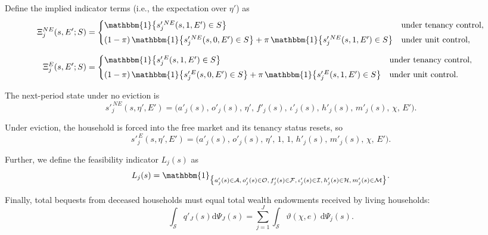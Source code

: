 \documentclass[parskip=full]{article}
\begin{document}
\noindent Define the implied indicator terms (i.e., the expectation over $\eta'$) as
\begin{equation}\label{eq:Xi_def}
\begin{aligned}
\Xi^{NE}_j(s,E';S)&=\begin{cases}
\mathbbm{1}\!\left\{ s'^{\,NE}_j(s,1,E') \in S \right\}
& \text{under tenancy control},\\[0.35em]
(1-\pi)\,\mathbbm{1}\!\left\{ s'^{\,NE}_j(s,0,E') \in S \right\}
+\pi\,\mathbbm{1}\!\left\{ s'^{\,NE}_j(s,1,E') \in S \right\}
& \text{under unit control},
\end{cases}
\\[0.6em]
\Xi^{E}_j(s,E';S)&=\begin{cases}
\mathbbm{1}\!\left\{ s'^{\,E}_j(s,1,E') \in S \right\}
& \text{under tenancy control},\\[0.35em]
(1-\pi)\,\mathbbm{1}\!\left\{ s'^{\,E}_j(s,0,E') \in S \right\}
+\pi\,\mathbbm{1}\!\left\{ s'^{\,E}_j(s,1,E') \in S \right\}
& \text{under unit control}.
\end{cases}
\end{aligned}
\end{equation}

\noindent The next-period state under no eviction is
\begin{equation}\label{eq:sprime_no_eviction}
s'^{\,NE}_j(s,\eta',E')=\bigl(a'_j(s),\,o'_j(s),\,\eta',\,f'_j(s),\,\iota'_j(s),\,h'_j(s),\,m'_j(s),\,\chi,\,E'\bigr).
\end{equation}

\noindent Under eviction, the household is forced into the free market and its tenancy status resets, so
\begin{equation}\label{eq:sprime_eviction}
s'^{\,E}_j(s,\eta',E')=\bigl(a'_j(s),\,o'_j(s),\,\eta',\,1,\,1,\,h'_j(s),\,m'_j(s),\,\chi,\,E'\bigr).
\end{equation}

\noindent Further, we define the feasibility indicator $L_j(s)$ as
\begin{equation}\label{eq:Lj}
L_j(s)=\mathbbm{1}_{\bigl\{a'_j(s)\in \mathcal{A},\,o'_j(s)\in \mathcal{O},\,f'_j(s)\in \mathcal{F},\,\iota'_j(s)\in \mathcal{I},\,
h'_j(s)\in \mathcal{H},\,m'_j(s)\in \mathcal{M}\bigr\}}.
\end{equation}

Finally, total bequests from deceased households must equal total wealth endowments received by living households:
\begin{equation}\label{market_clearing:agg_bequests}
    \int_{\mathcal{S}} q'_{J}(s) \mathrm{d}\Psi_{J}(s) = \sum_{j=1}^J \int_{\mathcal{S}} \vartheta (\chi,e)\ \mathrm{d}\Psi_j(s).
\end{equation}
\end{document}
